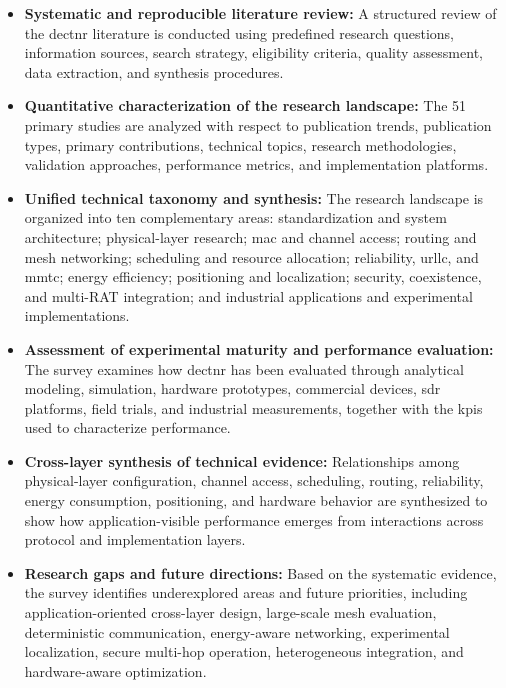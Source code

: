 \begin{itemize}

    \item \textbf{Systematic and reproducible literature review:}     A structured review of the \gls{dectnr} literature is conducted using     predefined research questions, information sources, search strategy,     eligibility criteria, quality assessment, data extraction, and synthesis     procedures.

    \item \textbf{Quantitative characterization of the research landscape:}     The 51 primary studies are analyzed with respect to publication trends,     publication types, primary contributions, technical topics, research     methodologies, validation approaches, performance metrics, and     implementation platforms.

    \item \textbf{Unified technical taxonomy and synthesis:}     The research landscape is organized into ten complementary areas:     standardization and system architecture; physical-layer research;     \gls{mac} and channel access; routing and mesh networking; scheduling and     resource allocation; reliability, \gls{urllc}, and \gls{mmtc}; energy     efficiency; positioning and localization; security, coexistence, and     multi-RAT integration; and industrial applications and experimental     implementations.

    \item \textbf{Assessment of experimental maturity and performance     evaluation:}     The survey examines how \gls{dectnr} has been evaluated through analytical     modeling, simulation, hardware prototypes, commercial devices,     \gls{sdr} platforms, field trials, and industrial measurements, together     with the \glspl{kpi} used to characterize performance.

    \item \textbf{Cross-layer synthesis of technical evidence:}     Relationships among physical-layer configuration, channel access,     scheduling, routing, reliability, energy consumption, positioning, and     hardware behavior are synthesized to show how application-visible     performance emerges from interactions across protocol and implementation     layers.

    \item \textbf{Research gaps and future directions:}     Based on the systematic evidence, the survey identifies underexplored     areas and future priorities, including application-oriented cross-layer     design, large-scale mesh evaluation, deterministic communication,     energy-aware networking, experimental localization, secure multi-hop     operation, heterogeneous integration, and hardware-aware optimization.

\end{itemize}

